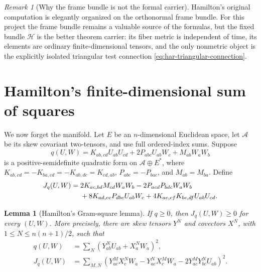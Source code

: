 \documentclass[10pt]{coll-l}
\newtheorem{lemma}[theorem]{Lemma}
\theoremstyle{definition}
\theoremstyle{remark}
\newtheorem{remark}[theorem]{Remark}
\numberwithin{section}{chapter}
\numberwithin{equation}{chapter}
\begin{document}
\begin{remark}[Why the frame bundle is not the formal carrier]
\label{rem:har-frame-bundle}
Hamilton's original computation is elegantly organized on the orthonormal
frame bundle.  For this project the frame bundle remains a valuable source
of the formulas, but the fixed bundle $\mathcal H$ is the better theorem
carrier: its fiber metric is independent of time, its elements are ordinary
finite-dimensional tensors, and the only nonmetric object is the explicitly
isolated triangular test connection \eqref{eq:har-triangular-connection}.
\end{remark}

\section{Hamilton's finite-dimensional sum of squares}
\label{sec:har-algebra}

We now forget the manifold.  Let $E$ be an $n$-dimensional Euclidean space,
let $\mathcal A$ be its skew covariant two-tensors, and use full ordered-index
sums.  Suppose
\begin{equation}
 q(U,W)=K_{ab,cd}U_{ab}U_{cd}
        +2P_{abc}U_{ab}W_c+M_{ab}W_aW_b                 \label{eq:har-abstract-q}
\end{equation}
is a positive-semidefinite quadratic form on $\mathcal A\oplus E^*$, where
$K_{ab,cd}=-K_{ba,cd}=-K_{ab,dc}=K_{cd,ab}$,
$P_{abc}=-P_{bac}$, and $M_{ab}=M_{ba}$.  Define
\begin{align}
 J_q(U,W)={}&2K_{ac,bd}M_{cd}W_aW_b
             -2P_{acd}P_{bdc}W_aW_b                    \notag\\
 &+8K_{ad,ce}P_{dbe}U_{ab}W_c
             +4K_{ae,cf}K_{be,df}U_{ab}U_{cd}.          \label{eq:har-abstract-J}
\end{align}

\begin{lemma}[Hamilton's Gram-square lemma]
\label{lem:har-Gram-square}
If $q\geq0$, then $J_q(U,W)\geq0$ for every $(U,W)$.  More precisely, there
are skew tensors $Y^N$ and covectors $X^N$, with
$1\leq N\leq n(n+1)/2$, such that
\begin{align}
 q(U,W)&=\sum_N(Y^N_{ab}U_{ab}+X^N_aW_a)^2,              \label{eq:har-Gram-q}\\
 J_q(U,W)&=\sum_{M,N}
 \left(
  Y^M_{ac}X^N_cW_a-Y^N_{ac}X^M_cW_a
       -2Y^M_{ac}Y^N_{bc}U_{ab}
 \right)^2.                                             \label{eq:har-Gram-J}
\end{align}
\end{lemma}
\end{document}
